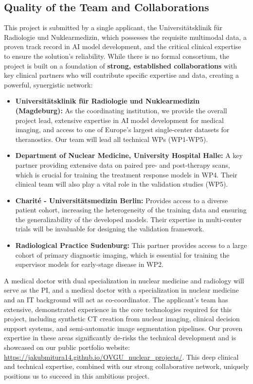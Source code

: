 \documentclass[11pt, a4paper]{article}
\begin{document}
\subsection{Quality of the Team and Collaborations}
This project is submitted by a single applicant, the Universitätsklinik für Radiologie und Nuklearmedizin, which possesses the requisite multimodal data, a proven track record in AI model development, and the critical clinical expertise to ensure the solution's reliability. While there is no formal consortium, the project is built on a foundation of \textbf{strong, established collaborations} with key clinical partners who will contribute specific expertise and data, creating a powerful, synergistic network:
\begin{itemize}
    \item \textbf{Universitätsklinik für Radiologie und Nuklearmedizin (Magdeburg):} As the coordinating institution, we provide the overall project lead, extensive expertise in AI model development for medical imaging, and access to one of Europe's largest single-center datasets for theranostics. Our team will lead all technical WPs (WP1-WP5).
    \item \textbf{Department of Nuclear Medicine, University Hospital Halle:} A key partner providing extensive data on paired pre- and post-therapy scans, which is crucial for training the treatment response models in WP4. Their clinical team will also play a vital role in the validation studies (WP5).
    \item \textbf{Charité - Universitätsmedizin Berlin:} Provides access to a diverse patient cohort, increasing the heterogeneity of the training data and ensuring the generalizability of the developed models. Their expertise in multi-center trials will be invaluable for designing the validation framework.
    \item \textbf{Radiological Practice Sudenburg:} This partner provides access to a large cohort of primary diagnostic imaging, which is essential for training the supervisor models for early-stage disease in WP2.
\end{itemize}
A medical doctor with dual specialization in nuclear medicine and radiology will serve as the PI, and a medical doctor with a specialization in nuclear medicine and an IT background will act as co-coordinator. The applicant's team has extensive, demonstrated experience in the core technologies required for this project, including synthetic CT creation from nuclear imaging, clinical decision support systems, and semi-automatic image segmentation pipelines. Our proven expertise in these areas significantly de-risks the technical development and is showcased on our public portfolio website: \url{https://jakubmitura14.github.io/OVGU_nuclear_projects/}. This deep clinical and technical expertise, combined with our strong collaborative network, uniquely positions us to succeed in this ambitious project.
\end{document}
